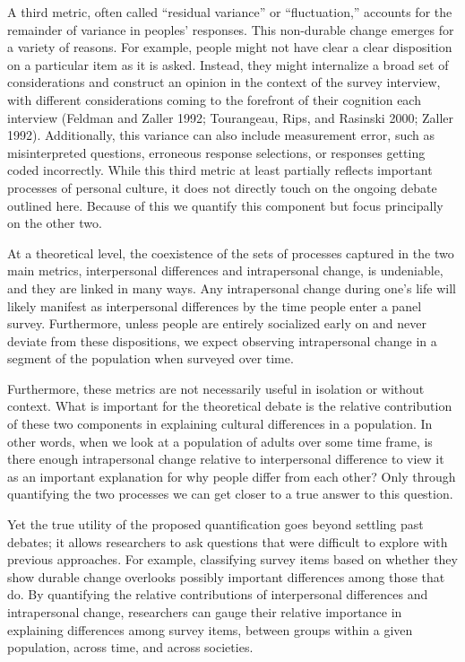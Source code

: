 \documentclass[
  12pt,
]{article}
\begin{document}
A third metric, often called ``residual variance'' or ``fluctuation,''
accounts for the remainder of variance in peoples' responses. This
non-durable change emerges for a variety of reasons. For example, people
might not have clear a clear disposition on a particular item as it is
asked. Instead, they might internalize a broad set of considerations and
construct an opinion in the context of the survey interview, with
different considerations coming to the forefront of their cognition each
interview (Feldman and Zaller 1992; Tourangeau, Rips, and Rasinski 2000;
Zaller 1992). Additionally, this variance can also include measurement
error, such as misinterpreted questions, erroneous response selections,
or responses getting coded incorrectly. While this third metric at least
partially reflects important processes of personal culture, it does not
directly touch on the ongoing debate outlined here. Because of this we
quantify this component but focus principally on the other two.

At a theoretical level, the coexistence of the sets of processes
captured in the two main metrics, interpersonal differences and
intrapersonal change, is undeniable, and they are linked in many ways.
Any intrapersonal change during one's life will likely manifest as
interpersonal differences by the time people enter a panel survey.
Furthermore, unless people are entirely socialized early on and never
deviate from these dispositions, we expect observing intrapersonal
change in a segment of the population when surveyed over time.

Furthermore, these metrics are not necessarily useful in isolation or
without context. What is important for the theoretical debate is the
relative contribution of these two components in explaining cultural
differences in a population. In other words, when we look at a
population of adults over some time frame, is there enough intrapersonal
change relative to interpersonal difference to view it as an important
explanation for why people differ from each other? Only through
quantifying the two processes we can get closer to a true answer to this
question.

Yet the true utility of the proposed quantification goes beyond settling
past debates; it allows researchers to ask questions that were difficult
to explore with previous approaches. For example, classifying survey
items based on whether they show durable change overlooks possibly
important differences among those that do. By quantifying the relative
contributions of interpersonal differences and intrapersonal change,
researchers can gauge their relative importance in explaining
differences among survey items, between groups within a given
population, across time, and across societies.
\end{document}

